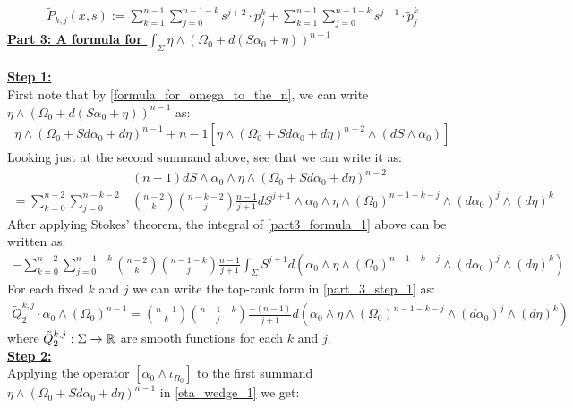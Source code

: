 \documentclass[11pt]{amsart}
\theoremstyle{plain}
\theoremstyle{definition}
\theoremstyle{remark}
\begin{document}
\begin{align}\label{def_of_Tilde_P}
   \tilde{P}_{k,j}(x,s):= \sum^{n-1}_{k=1} \sum^{n-1-k}_{j=0} s^{j+2} \cdot p^k_j + \sum^{n-1}_{k=1} \sum^{n-1-k}_{j=0} s^{j+1} \cdot \tilde{p}^k_j
\end{align}
\textbf{\underline{Part 3: A formula for $\int_{\Sigma} \eta  \wedge (\Omega_0 + d(S\alpha_0 + \eta ))^{n-1}$}}\\
\\
\textbf{\underline{Step 1:}}\\
First note that by \eqref{formula_for_omega_to_the_n}, we can write $\eta  \wedge (\Omega_0 + d(S\alpha_0 + \eta))^{n-1}$ as:
\begin{align}\label{eta_wedge_1}
\eta \wedge (\Omega_0 +Sd\alpha_0 + d\eta)^{n-1} + n-1 [\eta \wedge (\Omega_0 +Sd\alpha_0 + d\eta)^{n-2} \wedge (dS \wedge \alpha_0)]
\end{align}
Looking just at the second summand above, see that we can write it as:
\begin{align}\label{part3_formula_1}
    &(n-1)dS \wedge \alpha_0 \wedge \eta  \wedge (\Omega_0 +Sd\alpha_0 + d\eta)^{n-2} \nonumber\\
= \sum^{n-2}_{k=0} \sum^{n-k-2}_{j=0} &\binom{n-2}{k}  \binom{n-k-2}{j} \frac{n-1}{j+1} dS^{j+1} \wedge \alpha_0 \wedge \eta  \wedge (\Omega_0)^{n-1-k-j} \wedge (d\alpha_0)^j \wedge  (d\eta)^{k}
\end{align}
After applying Stokes' theorem, the integral of \eqref{part3_formula_1} above can be written as:
\begin{align}\label{part_3_step_1}
     - \sum^{n-2}_{k=0} \sum^{n-1-k}_{j=0} \binom{n-2}{k}  \binom{n-1-k}{j} \frac{n-1}{j+1} \int_{\Sigma} S^{j+1} d(\alpha_0 \wedge \eta  \wedge (\Omega_0)^{n-1-k-j} \wedge (d\alpha_0)^j \wedge  (d\eta)^{k})
\end{align}
For each fixed $k$ and $j$ we can write the top-rank form in \eqref{part_3_step_1} as:
\begin{align}\label{part_3_final_1}
\tilde{Q}^{k,j}_2 \cdot \alpha_0 \wedge (\Omega_0)^{n-1} =  \binom{n-1}{k}  \binom{n-1-k}{j} \frac{-(n-1)}{j+1} d(\alpha_0 \wedge \eta  \wedge (\Omega_0)^{n-1-k-j} \wedge (d\alpha_0)^j \wedge  (d\eta)^{k})
\end{align}
where $\Tilde{Q}^{k,j}_2: \Sigma \rightarrow \mathbb{R}$ are  smooth functions for each $k$ and $j$.\\
\textbf{\underline{Step 2:}}\\
Applying the operator $[\alpha_0 \wedge \iota_{R_0}]$ to the first summand $\eta  \wedge (\Omega_0 +Sd\alpha_0 + d\eta)^{n-1}$ in \eqref{eta_wedge_1} we get:
\end{document}
